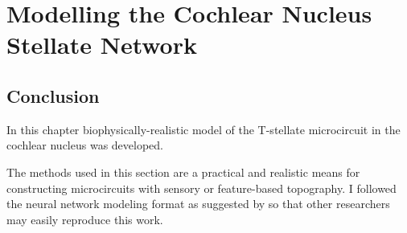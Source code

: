 \documentclass[11pt,a4paper %
]{book} %
\begin{document}

\setcounter{chapter}{2}
\chapter[Simple Responses]{Modelling the Cochlear Nucleus Stellate Network}
\label{sec:SimpleResponsesChapter}



\newpage

\newpage

\newpage

% 
\newpage


\section{Conclusion}

In this chapter biophysically-realistic model of the
T-stellate microcircuit in the cochlear nucleus was developed.


The methods used in this section are a practical and realistic means
for constructing microcircuits with sensory or feature-based
topography.  I followed the neural network modeling format as
suggested by \citet{NordlieGewaltigEtAl:2009} so that other
researchers may easily reproduce this work. 


\appendix


 

\newpage
\listoftodos
\end{document}
